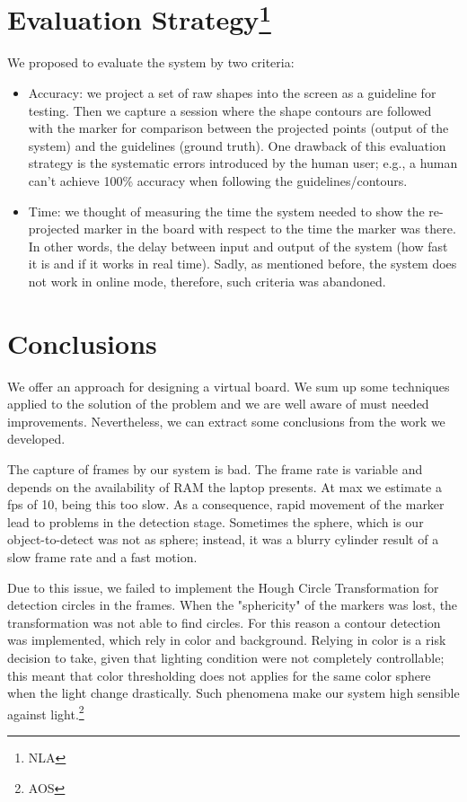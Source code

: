 \documentclass[a4paper,12pt]{article}
\begin{document}
\section[Evaluation Strategy]{Evaluation Strategy\footnote{NLA}}
We proposed to evaluate the system by two criteria:
\begin{itemize}
\item Accuracy: we project a set of raw shapes into the screen as a guideline for testing. Then we capture a session where the shape contours are followed with the marker for comparison between the projected points (output of the system) and the guidelines (ground truth). One drawback of this evaluation strategy is the systematic errors introduced by the human user; e.g., a human can't achieve 100\% accuracy when following the guidelines/contours.
\item Time: we thought of measuring the time the system needed to show the re-projected marker in the board with respect to the time the marker was there. In other words, the delay between input and output of the system (how fast it is and if it works in real time). Sadly, as mentioned before, the system does not work in online mode, therefore, such criteria was abandoned.
\end{itemize}
\section[Conclusions]{Conclusions}
We offer an approach for designing a virtual board. We sum up some techniques applied to the solution of the problem and we are well aware of must needed improvements. Nevertheless, we can extract some conclusions from the work we developed.


The capture of frames by our system is bad. The frame rate is variable and depends on the availability of RAM the laptop presents. At max we estimate a fps of 10, being this too slow. As a consequence, rapid movement of the marker lead to problems in the detection stage. Sometimes the sphere, which is our object-to-detect was not as sphere; instead, it was a blurry cylinder result of a slow frame rate and a fast motion.


Due to this issue, we failed to implement the Hough Circle Transformation for detection circles in the frames. When the "sphericity" of the markers was lost, the transformation was not able to find circles. For this reason a contour detection was implemented, which rely in color and background. Relying in color is a risk decision to take, given that lighting condition were not completely controllable; this meant that color thresholding does not applies for the same color sphere when the light change drastically. Such phenomena make our system high sensible against light.\footnote{AOS}
\end{document}
